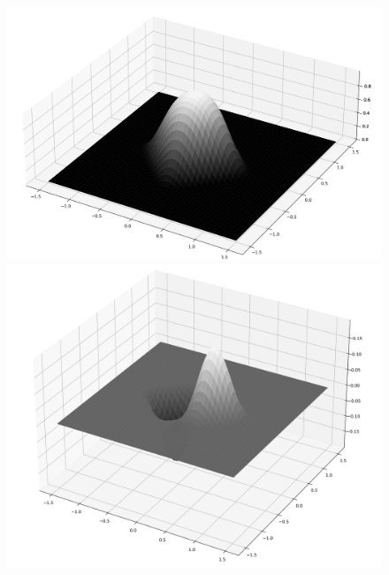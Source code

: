 \documentclass[fleqn, bachelor,subf,12pt,notitlepage]{article}
\begin{document}
\begin{figure}[H]
  \centering
  \begin{minipage}[b]{0.4\textwidth}
    \includegraphics[width=\textwidth]{images/argyris_basis_func_value}
  \end{minipage}
  \hfill
  \begin{minipage}[b]{0.4\textwidth}
    \includegraphics[width=\textwidth]{images/argyris_basis_fx_value}
  \end{minipage}
\\
  \begin{minipage}[b]{0.4\textwidth}

\end{minipage}
\end{figure}
\end{document}
